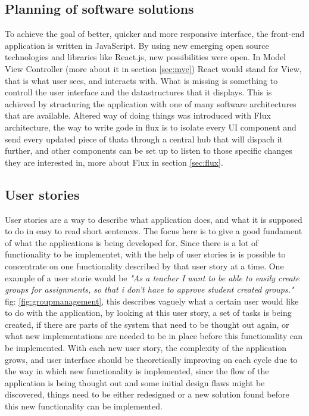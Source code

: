 \subsection{Planning of software solutions}
To achieve the goal of better, quicker and more responsive interface, the front-end application is written in JavaScript. By using new emerging open source technologies and libraries like React.js, new possibilities were open. In Model View Controller (more about it in section \ref{sec:mvc}) React would stand for View, that is what user sees, and interacts with. What is missing is something to controll the user interface and the datastructures that it displays. This is achieved by structuring the application with one of many software architectures that are available. Altered way of doing things was introduced with Flux architecture, the way to write gode in flux is to isolate every UI component and send every updated piece of thata through a central hub that will dispach it further, and other components can be set up to listen to those specific changes they are interested in, more about Flux in section \ref{sec:flux}.
\\
\todo{}
\subsection{User stories}
User stories are a way to describe what application does, and what it is supposed to do in easy to read short sentences. The focus here is to give a good fundament of what the applications is being developed for. Since there is a lot of functionality to be implementet, with the help of user stories is is possible to concentrate on one functionality described by that user story at a time. One example of a user storie would be \emph{"As a teacher I want to be able to easily create groups for assignments, so that i don't have to approve student created groups."} fig: \ref{fig:groupmanagement},  this describes vaguely what a certain user would like to do with the application, by looking at this user story, a set of tasks is being created, if there are parts of the system that need to be thought out again, or what new implementations are needed to be in place before this functionality can be implemented. With each new user story, the complexity of the application grows, and user interface should be theoretically improving on each cycle due to the way in which new functionality is implemented, since the flow of the application is being thought out and some initial design flaws might be discovered, things need to be either redesigned or a new solution found before this new functionality can be implemented. 

